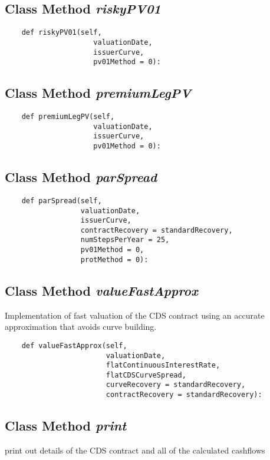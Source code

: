 \documentclass[twoside,11pt]{book}
\begin{document}
\subsection{Class Method {\it riskyPV01}}


\begin{lstlisting}
    def riskyPV01(self,
                     valuationDate,
                     issuerCurve,
                     pv01Method = 0):
\end{lstlisting}

\subsection{Class Method {\it premiumLegPV}}


\begin{lstlisting}
    def premiumLegPV(self,
                     valuationDate,
                     issuerCurve,
                     pv01Method = 0):
\end{lstlisting}

\subsection{Class Method {\it parSpread}}


\begin{lstlisting}
    def parSpread(self,
                  valuationDate,
                  issuerCurve,
                  contractRecovery = standardRecovery,
                  numStepsPerYear = 25,
                  pv01Method = 0,
                  protMethod = 0):
\end{lstlisting}

\subsection{Class Method {\it valueFastApprox}}
Implementation of fast valuation of the CDS contract using an accurate approximation that avoids curve building. 

\begin{lstlisting}
    def valueFastApprox(self,
                        valuationDate,
                        flatContinuousInterestRate,
                        flatCDSCurveSpread,
                        curveRecovery = standardRecovery,
                        contractRecovery = standardRecovery):
\end{lstlisting}

\subsection{Class Method {\it print}}
print out details of the CDS contract and all of the calculated cashflows 
\end{document}
